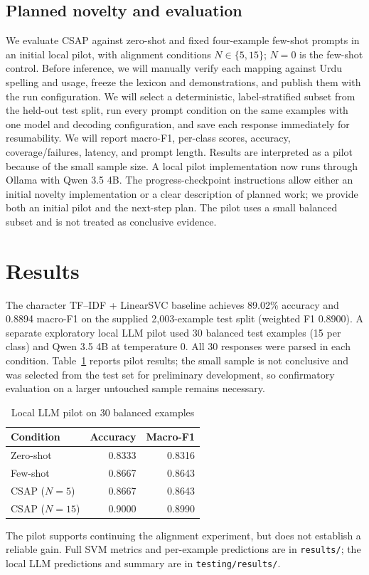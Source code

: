 \documentclass[conference]{IEEEtran}
\begin{document}
\subsection{Planned novelty and evaluation}
We evaluate CSAP against zero-shot and fixed four-example few-shot prompts in an initial local pilot, with alignment conditions $N\in\{5,15\}$; $N=0$ is the few-shot control. Before inference, we will manually verify each mapping against Urdu spelling and usage, freeze the lexicon and demonstrations, and publish them with the run configuration. We will select a deterministic, label-stratified subset from the held-out test split, run every prompt condition on the same examples with one model and decoding configuration, and save each response immediately for resumability. We will report macro-F1, per-class scores, accuracy, coverage/failures, latency, and prompt length. Results are interpreted as a pilot because of the small sample size. A local pilot implementation now runs through Ollama with Qwen 3.5 4B. The progress-checkpoint instructions allow either an initial novelty implementation or a clear description of planned work; we provide both an initial pilot and the next-step plan. The pilot uses a small balanced subset and is not treated as conclusive evidence.
\section{Results}
The character TF--IDF + LinearSVC baseline achieves 89.02\% accuracy and 0.8894 macro-F1 on the supplied 2,003-example test split (weighted F1 0.8900). A separate exploratory local LLM pilot used 30 balanced test examples (15 per class) and Qwen 3.5 4B at temperature 0. All 30 responses were parsed in each condition. Table~\ref{tab:pilot} reports pilot results; the small sample is not conclusive and was selected from the test set for preliminary development, so confirmatory evaluation on a larger untouched sample remains necessary.
\begin{table}[t]\centering\caption{Local LLM pilot on 30 balanced examples}\label{tab:pilot}\begin{tabular}{lrr}\toprule Condition & Accuracy & Macro-F1 \\ \midrule Zero-shot & 0.8333 & 0.8316 \\ Few-shot & 0.8667 & 0.8643 \\ CSAP ($N=5$) & 0.8667 & 0.8643 \\ CSAP ($N=15$) & 0.9000 & 0.8990 \\ \bottomrule\end{tabular}\end{table}
The pilot supports continuing the alignment experiment, but does not establish a reliable gain. Full SVM metrics and per-example predictions are in \texttt{results/}; the local LLM predictions and summary are in \texttt{testing/results/}.
\end{document}
